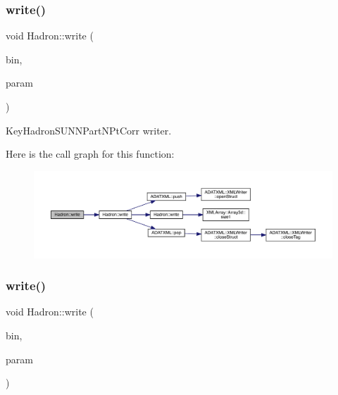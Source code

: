 \subsubsection{\texorpdfstring{write()}{write()}\hspace{0.1cm}{\footnotesize\ttfamily [55/95]}}
{\footnotesize\ttfamily void Hadron\+::write (\begin{DoxyParamCaption}\item[{\mbox{\hyperlink{classADATIO_1_1BinaryWriter}{Binary\+Writer}} \&}]{bin,  }\item[{const \mbox{\hyperlink{structHadron_1_1KeyHadronSUNNPartNPtCorr__t}{Key\+Hadron\+S\+U\+N\+N\+Part\+N\+Pt\+Corr\+\_\+t}} \&}]{param }\end{DoxyParamCaption})}



Key\+Hadron\+S\+U\+N\+N\+Part\+N\+Pt\+Corr writer. 

Here is the call graph for this function\+:\nopagebreak
\begin{figure}[H]
\begin{center}
\leavevmode
\includegraphics[width=350pt]{d1/daf/namespaceHadron_a767bdf4c228c06edad1c47918ec75ed3_cgraph}
\end{center}
\end{figure}
\mbox{\label{namespaceHadron_a7b503b82bc88cdec19d5b7173957b35e}} 
\subsubsection{\texorpdfstring{write()}{write()}\hspace{0.1cm}{\footnotesize\ttfamily [56/95]}}
{\footnotesize\ttfamily void Hadron\+::write (\begin{DoxyParamCaption}\item[{\mbox{\hyperlink{classADATIO_1_1BinaryWriter}{Binary\+Writer}} \&}]{bin,  }\item[{const \mbox{\hyperlink{structHadron_1_1ValTimeSlice__t}{Val\+Time\+Slice\+\_\+t}} \&}]{param }\end{DoxyParamCaption})}



